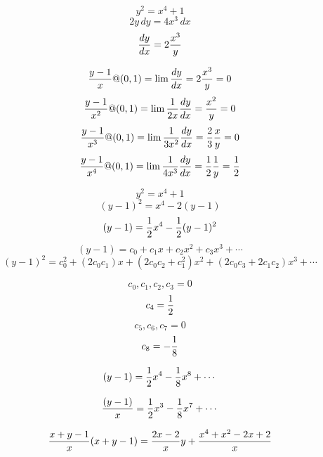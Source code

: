 
$$y^2=x^4+1$$
$$2y\,dy=4x^3\,dx$$
$${{dy}\over{dx}} = 2{x^3\over y}$$

$${{y-1}\over{x}} @ (0,1) = \lim {{dy}\over{dx}} = 2 {{x^3}\over y} = 0$$
$${{y-1}\over{x^2}} @ (0,1) = \lim {1\over{2x}}{{dy}\over{dx}} = {{x^2}\over y} = 0$$
$${{y-1}\over{x^3}} @ (0,1) = \lim {1\over{3x^2}}{{dy}\over{dx}} = {2\over3}{{x}\over y} = 0$$
$${{y-1}\over{x^4}} @ (0,1) = \lim {1\over{4x^3}}{{dy}\over{dx}} = {1\over2}{1\over y} = {1\over2}$$


$$y^2 = x^4 + 1 $$
$$(y-1)^2 = x^4 - 2(y-1)$$
$$(y-1) = {1\over2}x^4 - {1\over2}(y-1)^2$$
$$(y-1) = c_0 + c_1 x + c_2 x^2 + c_3 x^3 + \cdots$$
$$(y-1)^2 = c_0^2 + (2 c_0 c_1) x + (2 c_0 c_2 + c_1^2) x^2 + (2 c_0 c_3 + 2 c_1 c_2) x^3 + \cdots$$

$$ c_0, c_1, c_2, c_3 = 0 $$
$$ c_4 = {1\over2}$$
$$ c_5, c_6, c_7 = 0 $$
$$ c_8 = -{1\over8} $$

$$ (y-1) = {1\over2} x^4 - {1\over8} x^8 + \cdots$$

$$ {(y-1)\over x} = {1\over2} x^3 - {1\over8} x^7 + \cdots$$


\vfill\eject
$${{x+y-1}\over x} (x+y-1) = {{2x-2}\over x} y + {{x^4+x^2-2x+2}\over x} $$



